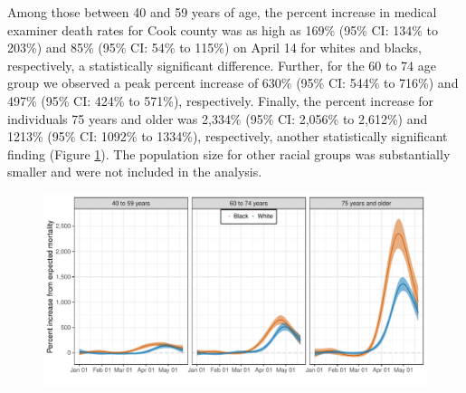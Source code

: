 \documentclass[11pt]{article}
\begin{document}
Among those between 40 and 59 years of age, the percent increase in medical examiner death rates for Cook county was as high as 169\% (95\% CI: 134\% to 203\%) and 85\%  (95\% CI: 54\% to 115\%) on April 14 for whites and blacks, respectively, a statistically significant difference. Further, for the 60 to 74 age group we observed a peak percent increase of 630\% (95\% CI: 544\% to 716\%) and 497\% (95\% CI: 424\% to 571\%), respectively. Finally, the percent increase for individuals 75 years and older was 2,334\% (95\% CI: 2,056\% to 2,612\%) and 1213\% (95\% CI: 1092\% to 1334\%), respectively, another statistically significant finding (Figure \ref{fig:cook-white-v-black}).  The population size for other racial groups was substantially smaller and were not included in the analysis.

\begin{figure}[ht]
	\centering	
		\includegraphics[width=1\linewidth]{figs/figure-3.pdf} 
	\caption{}
	\label{fig:cook-white-v-black}
\end{figure}

 
\end{document}
